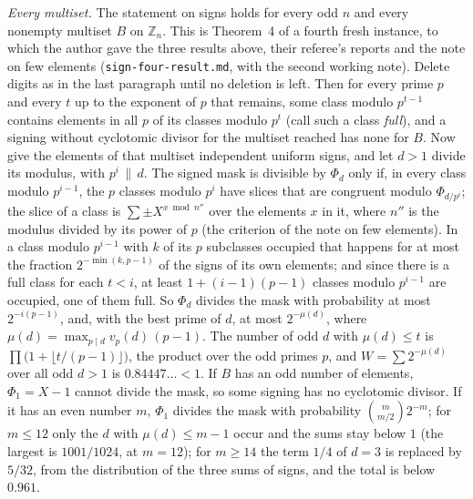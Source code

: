 \documentclass[11pt,a4paper]{amsart}
\theoremstyle{definition}
\theoremstyle{remark}
\newcommand{\Z}{\mathbb{Z}}
\begin{document}
\emph{Every multiset.} The statement on signs holds for every odd $n$ and every nonempty multiset $B$ on $\Z_n$. This is
Theorem~4 of a fourth fresh instance, to which the author gave the three results above, their referee's reports and the
note on few elements (\texttt{sign-four-result.md}, with the second working note). Delete digits as in the last
paragraph until no deletion is left. Then for every prime $p$ and every $t$ up to the exponent of $p$ that remains, some
class modulo $p^{t-1}$ contains elements in all $p$ of its classes modulo $p^t$ (call such a class \emph{full}), and a
signing without cyclotomic divisor for the multiset reached has none for $B$. Now give the elements of that multiset
independent uniform signs, and let $d>1$ divide its modulus, with $p^i\,\|\,d$. The signed mask is divisible by $\Phi_d$
only if, in every class modulo $p^{i-1}$, the $p$ classes modulo $p^i$ have slices that are congruent modulo
$\Phi_{d/p^i}$; the slice of a class is $\sum\pm X^{x\bmod n''}$ over the elements $x$ in it, where $n''$ is the modulus
divided by its power of $p$ (the criterion of the note on few elements). In a class modulo $p^{i-1}$ with $k$ of its $p$ subclasses occupied that happens for at most the
fraction $2^{-\min(k,p-1)}$ of the signs of its own elements; and since there is a full class for each $t<i$, at least
$1+(i-1)(p-1)$ classes modulo $p^{i-1}$ are occupied, one of them full. So $\Phi_d$ divides the mask with probability at
most $2^{-i(p-1)}$, and, with the best prime of $d$, at most $2^{-\mu(d)}$, where $\mu(d)=\max_{p\mid d}v_p(d)\,(p-1)$.
The number of odd $d$ with $\mu(d)\le t$ is $\prod\bigl(1+\lfloor t/(p-1)\rfloor\bigr)$, the product over the odd
primes $p$, and
$W=\sum 2^{-\mu(d)}$ over all odd $d>1$ is $0.84447\ldots<1$. If $B$ has an odd number of elements, $\Phi_1=X-1$ cannot
divide the mask, so some signing has no cyclotomic divisor. If it has an even number $m$, $\Phi_1$ divides the mask
with probability $\binom{m}{m/2}2^{-m}$; for $m\le12$ only the $d$ with $\mu(d)\le m-1$ occur and the sums stay below
$1$ (the largest is $1001/1024$, at $m=12$); for $m\ge14$ the term $1/4$ of $d=3$ is replaced by $5/32$, from the
distribution of the three sums of signs, and the total is below $0.961$.
\end{document}
